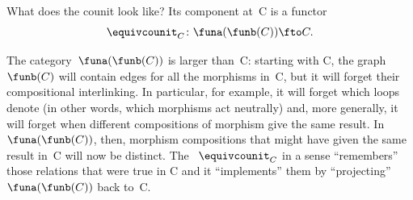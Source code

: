 \begin{example}
    What does the counit look like?
    Its component at~C is a functor
    \begin{equation}\label{eq:cat-graph-adjunction-co-unit}
        \equivcounit_{C} \colon \funa(\funb(C)) \fto C.
    \end{equation}

    The category~$\funa(\funb(C))$ is larger than~C: starting with C, the graph~$\funb(C)$ will contain edges for all the morphisms in~C, but it will forget their compositional interlinking.
    In particular, for example, it will forget which loops denote  (in other words, which morphisms act neutrally) and, more generally, it will forget when different compositions of morphism give the same result.
    In~$\funa(\funb(C))$, then, morphism compositions that might have given the same result in~C will now be distinct.
    The ~$\equivcounit_{C}$ in a sense ``remembers'' those relations that were true in C and it ``implements'' them by ``projecting''~$\funa(\funb(C))$ back to~C.
\end{example}
